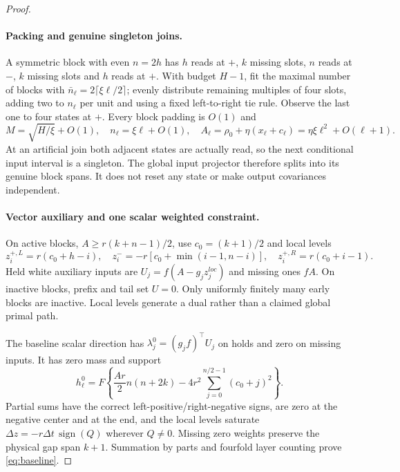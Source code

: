 \documentclass[11pt]{article}
\begin{document}
\begin{proof}
\paragraph{Packing and genuine singleton joins.}
A symmetric block with even $n=2h$ has $h$ reads at $+$, $k$ missing slots,
$n$ reads at $-$, $k$ missing slots and $h$ reads at $+$.
With budget $H-1$, fit the maximal number of blocks with
$\bar n_\ell=2\lceil\xi\ell/2\rceil$; evenly distribute remaining multiples of
four slots, adding two to $n_\ell$ per unit and using a fixed left-to-right
tie rule. Observe the last one to four states at $+$.
Every block padding is $O(1)$ and
\[
M=\sqrt{H/\xi}+O(1),\quad n_\ell=\xi\ell+O(1),\quad
A_\ell=\rho_0+\eta(x_\ell+c_\ell)=\eta\xi\ell^2+O(\ell+1).
\]
At an artificial join both adjacent states are actually read, so the next
conditional input interval is a singleton.
The global input projector therefore splits into its genuine block spans.
It does not reset any state or make output covariances independent.

\paragraph{Vector auxiliary and one scalar weighted constraint.}
On active blocks, $A\ge r(k+n-1)/2$, use $c_0=(k+1)/2$ and local levels
\[
z_i^{+,L}=r(c_0+h-i),\quad
z_i^-=-r[c_0+\min(i-1,n-i)],\quad
z_i^{+,R}=r(c_0+i-1).
\]
Held white auxiliary inputs are $U_j=f(A-g_jz_j^{loc})$ and missing ones $fA$.
On inactive blocks, prefix and tail set $U=0$.
Only uniformly finitely many early blocks are inactive.
Local levels generate a dual rather than a claimed global primal path.

The baseline scalar direction has $\lambda_j^0=(g_jf)^\top U_j$ on holds
and zero on missing inputs. It has zero mass and support
\begin{equation}\label{eq:baseline}
h_\ell^0=F\left\{\frac{Ar}{2}n(n+2k)
-4r^2\sum_{j=0}^{n/2-1}(c_0+j)^2\right\}.
\end{equation}
Partial sums have the correct left-positive/right-negative signs,
are zero at the negative center and at the end, and the local levels
saturate $\Delta z=-r\Delta t\,\operatorname{sign}(Q)$ wherever $Q\ne0$.
Missing zero weights preserve the physical gap span $k+1$.
Summation by parts and fourfold layer counting prove \eqref{eq:baseline}.


\end{proof}
\end{document}
